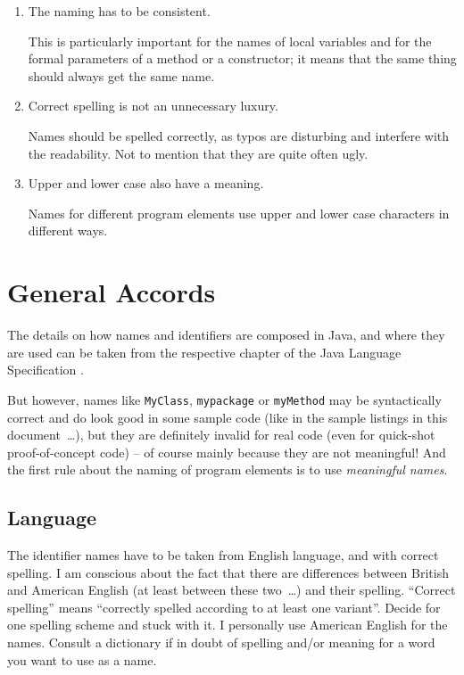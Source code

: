 \documentclass[11pt,a4paper, titlepage, parskip=half, headsepline, footsepline, cleardoublepage=current, headheight=1cm]{scrbook}
\begin{document}
\begin{enumerate}[label=P\arabic*.]
\item{The naming has to be consistent.

This is particularly important for the names of local variables and for the formal parameters of a method or a constructor; it means that the same thing should always get the same name.}

\item{Correct spelling is not an unnecessary luxury.

Names should be spelled correctly, as typos are disturbing and interfere with the readability. Not to mention that they are quite often ugly.}

\item{Upper and lower case also have a meaning.

Names for different program elements use upper and lower case characters in different ways.}
\end{enumerate}


\section{General Accords}
The details on how names and identifiers are composed in Java, and where they are used can be taken from the respective chapter of the Java Language Specification \autocite{ORACLE_DOC_LANGUAGE_SPECIFICATION:NamesAndIdentifiers}.

But however, names like \lstinline|MyClass|, \lstinline|mypackage| or \lstinline|myMethod| may be syntactically correct and do look good in some sample code (like in the sample listings in this document~…), but they are definitely invalid for real code (even for quick-shot proof-of-concept code) – of course mainly because they are not meaningful! And the first rule about the naming of program elements is to use \textit{meaningful names}. 


\subsection{Language}
The identifier names have to be taken from English language, and with correct spelling. I am conscious about the fact that there are differences between British and American English (at least between these two~…) and their spelling. “Correct spelling” means “correctly spelled according to at least one variant”. Decide for one spelling scheme and stuck with it. I personally use American English for the names. Consult a dictionary if in doubt of spelling and/or meaning for a word you want to use as a name.
\end{document}
